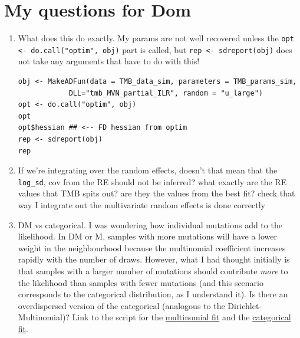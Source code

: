 \documentclass{article}
\begin{document}
\section{My questions for Dom}
\begin{enumerate}

\item What does this do exactly. My params are not well recovered unless the  \verb|opt <- do.call("optim", obj)|
part is called, but \verb|rep <- sdreport(obj)| does not take any arguments that have to do with this!

\begin{lstlisting}
obj <- MakeADFun(data = TMB_data_sim, parameters = TMB_params_sim,
            DLL="tmb_MVN_partial_ILR", random = "u_large")
opt <- do.call("optim", obj)
opt
opt$hessian ## <-- FD hessian from optim
rep <- sdreport(obj)
rep
\end{lstlisting}

\item If we're integrating over the random effects, doesn't that mean that the \verb|log_sd|, cov from the RE should not be inferred? what exactly are the RE values that TMB spits out? are they the values from the best fit? check that way I integrate out the multivariate random effects is done correctly

\item DM vs categorical. I was wondering how individual mutations add to the likelihood. In DM or M, samples with more mutations will have a lower weight in the neighbourhood because the multinomial coefficient increases rapidly with the number of draws. However, what I had thought initially is that samples with a larger number of mutations should contribute \emph{more} to the likelihood than samples with fewer mutations (and this scenario corresponds to the categorical distribution, as I understand it). Is there an overdispersed version of the categorical (analogous to the Dirichlet-Multinomial)? Link to the script for the \href{https://github.com/lm687/Global_Differential_Abundance_Pipeline/blob/master/code/2_inference_TMB/mm_multinomial/fullRE_ME_multinomial.cpp}{multinomial fit} and the \href{https://github.com/lm687/Global_Differential_Abundance_Pipeline/blob/master/code/2_inference_TMB/mm_multinomial/fullRE_ME_multinomial_categorical.cpp}{categorical fit}.


\end{enumerate}
\end{document}
